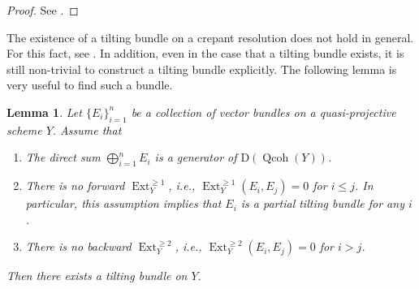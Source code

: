 \documentclass[11pt]{article}
\DeclareMathOperator{\Ext}{Ext}
\DeclareMathOperator{\Qcoh}{Qcoh}
\numberwithin{equation}{section}
\newtheorem{Lemma}[Theorem]{Lemma}
\begin{document}
\begin{proof}See \cite[Lemma 3.4]{H17c}.
\end{proof}

The existence of a tilting bundle on a crepant resolution does not hold in general.
For this fact, see \cite[Theorem 4.20]{IW14b}.
In addition, even in the case that a tilting bundle exists, it is still non-trivial to construct a tilting bundle explicitly.
The following lemma is very useful to find such a bundle.

\begin{Lemma} \label{lem prelim tilting semiuniv}
Let $\{ E_i \}_{i=1}^n$ be a collection of vector bundles on a quasi-projective scheme $Y$.
Assume that
\begin{enumerate}\itemsep=0pt
\item[$(i)$] The direct sum $\bigoplus_{i=1}^n E_i$ is a generator of $\mathrm{D}(\Qcoh(Y))$.
\item[$(ii)$] There is no forward $\Ext^{\geq 1}_Y$, i.e., $\Ext_Y^{\geq 1}(E_i, E_j) = 0$ for $i \leq j$.
In particular, this assumption implies that $E_i$ is a partial tilting bundle for any $i$.
\item[$(iii)$] There is no backward $\Ext^{\geq 2}_Y$, i.e., $\Ext_Y^{\geq 2}(E_i, E_j) = 0$ for $i > j$.
\end{enumerate}
Then there exists a tilting bundle on $Y$.
\end{Lemma}
\end{document}

